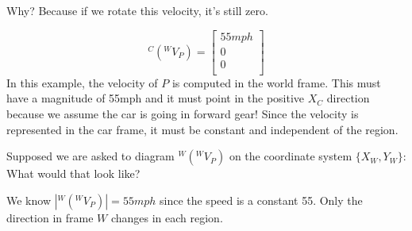 \begin{Example}
Why? Because if we rotate this velocity, it's still zero.

\[
^C(^WV_P) =  \left [
\begin{array}{c}
55mph \\
0 \\
0 \\
\end{array}
\right ]
\]
In this example, the velocity of $P$ is computed in the world frame.   This must have a magnitude of 55mph and it must point in the positive $X_C$ direction because we assume the car is going in forward gear!  Since the velocity is represented in the car frame, it must be constant and independent of the region.

Supposed we are asked to diagram
$
^W(^WV_P)
$
on the coordinate system $\{X_W,Y_W\}$:  What would that look like?\\[0.15in]


We know $|^W(^WV_P)| = 55mph$ since the speed is a constant 55.  Only the direction in frame $W$ changes in each region.



%
%
%
%
%

\end{Example}




